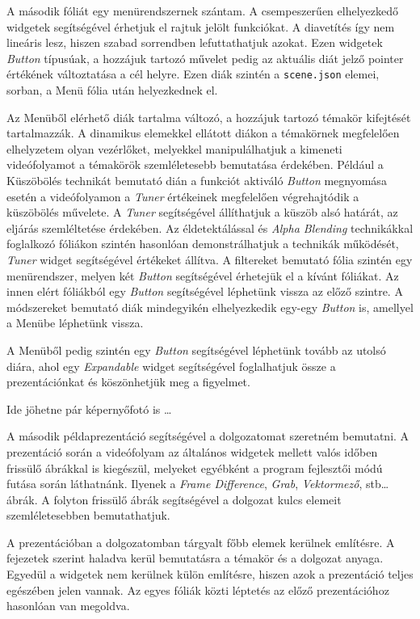 A második fóliát egy menürendszernek szántam. A csempeszerűen elhelyezkedő widgetek segítségével érhetjuk el rajtuk jelölt funkciókat. A diavetítés így nem lineáris lesz, hiszen szabad sorrendben lefuttathatjuk azokat. Ezen widgetek \textit{Button} típusúak, a hozzájuk tartozó művelet pedig az aktuális diát jelző pointer értékének változtatása a cél helyre. Ezen diák szintén a \texttt{scene.json} elemei, sorban, a Menü fólia után helyezkednek el.

Az Menüből elérhető diák tartalma változó, a hozzájuk tartozó témakör kifejtését tartalmazzák. A dinamikus elemekkel ellátott diákon a témakörnek megfelelően elhelyzetem olyan vezérlőket, melyekkel manipulálhatjuk a kimeneti videófolyamot a témakörök szemléletesebb bemutatása érdekében.
Például a Küszöbölés technikát bemutató dián a funkciót aktiváló \textit{Button} megnyomása esetén a videófolyamon a \textit{Tuner} értékeinek megfelelően végrehajtódik a küszöbölés művelete. A \textit{Tuner} segítségével állíthatjuk a küszöb alsó határát, az eljárás szemléltetése érdekében.
Az éldetektálással és \textit{Alpha Blending} technikákkal foglalkozó fóliákon szintén hasonlóan demonstrálhatjuk a technikák működését, \textit{Tuner} widget segítségével értékeket állítva.
A filtereket bemutató fólia szintén egy menürendszer, melyen két \textit{Button} segítségével érhetejük el a kívánt fóliákat. Az innen elért fóliákból egy \textit{Button} segítségével léphetünk vissza az előző szintre.
A módszereket bemutató diák mindegyikén elhelyezkedik egy-egy \textit{Button} is, amellyel a Menübe léphetünk vissza.

A Menüből pedig szintén egy \textit{Button} segítségével léphetünk tovább az utolsó diára, ahol egy \textit{Expandable} widget segítségével foglalhatjuk össze a prezentációnkat és köszönhetjük meg a figyelmet.

Ide jöhetne pár képernyőfotó is \ldots


A második példaprezentáció segítségével a dolgozatomat szeretném bemutatni.
A prezentáció során a videófolyam az általános widgetek mellett valós időben frissülő ábrákkal is kiegészül, melyeket egyébként a program fejlesztői módú futása során láthatnánk. Ilyenek a \textit{Frame Difference}, \textit{Grab}, \textit{Vektormező}, stb\ldots ábrák. A folyton frissülő ábrák segítségével a dolgozat kulcs elemeit szemléletesebben bemutathatjuk.

A prezentációban a dolgozatomban tárgyalt főbb elemek kerülnek említésre. A fejezetek szerint haladva kerül bemutatásra a témakör és a dolgozat anyaga. Egyedül a widgetek nem kerülnek külön említésre, hiszen azok a prezentáció teljes egészében jelen vannak. Az egyes fóliák közti léptetés az előző prezentációhoz hasonlóan van megoldva.

